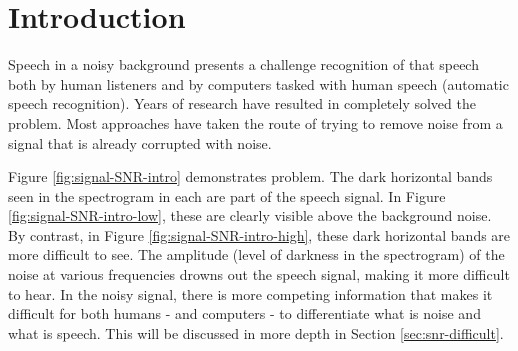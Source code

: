 % 
% 
% 

\chapter{Introduction\label{chapter1}}

Speech in a noisy background presents a challenge \DIFdelbegin {}\DIFdelend \DIFaddbegin {}\DIFaddend recognition of that speech both by human listeners and by computers tasked with \DIFdelbegin {}\DIFdelend \DIFaddbegin {}\DIFaddend human speech (\DIFdelbegin {}\DIFdelend automatic speech recognition\DIFaddbegin {}\DIFaddend ).  Years of research have resulted in \DIFdelbegin {}\DIFdelend \DIFaddbegin {}\DIFaddend completely solved the problem.  Most approaches have taken the route of trying to remove noise from a signal that is already corrupted with noise.

Figure \ref{fig:signal-SNR-intro} demonstrates \DIFdelbegin {}\DIFdelend \DIFaddbegin {}\DIFaddend problem.  The dark horizontal bands seen in the spectrogram in each \DIFdelbegin {}\DIFdelend \DIFaddbegin {}\DIFaddend are part of the speech signal.  In Figure \ref{fig:signal-SNR-intro-low}, these are clearly visible above the background noise.  By contrast, in Figure \ref{fig:signal-SNR-intro-high}, these dark horizontal bands are more difficult to see.  The amplitude (level of darkness in the spectrogram) of the noise at various frequencies drowns out the speech signal, making it more difficult to hear.  In the noisy signal, there is more competing information that makes it difficult for both humans - and computers - to differentiate what is noise and what is speech.  This will be discussed in more depth in Section \ref{sec:snr-difficult}.


